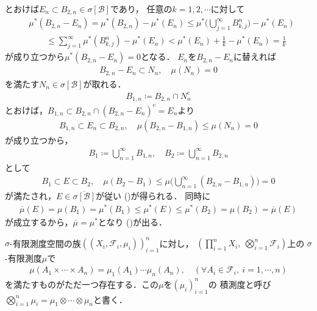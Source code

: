 \begin{prf}
\begin{description}
					とおけば$E_n \subset B_{2,n} \in \sigma[\mathcal{B}]$であり，
					任意の$k = 1,2,\cdots$に対して
					\begin{align}
						&\mu^*(B_{2,n} - E_n) = \mu^*(B_{2,n}) - \mu^*(E_n)
						\leq \mu^*\Biggl( \bigcup_{j=1}^\infty B^n_{k,j} \Biggr) - \mu^*(E_n) \\
						&\qquad \leq \sum_{j=1}^\infty \mu^*\left( B^n_{k,j} \right) - \mu^*(E_n)
						< \mu^*(E_n) + \frac{1}{k} - \mu^*(E_n)
						= \frac{1}{k}
					\end{align}
					が成り立つから$\mu^*(B_{2,n} - E_n) = 0$となる．
					$E_n$を$B_{2,n} - E_n$に替えれば
					\begin{align}
						B_{2,n} - E_n \subset N_n, \quad \mu(N_n) = 0
					\end{align}
					を満たす$N_n \in \sigma[\mathcal{B}]$が取れる．
					\begin{align}
						B_{1,n} \coloneqq B_{2,n} \cap N_n^c
					\end{align}
					とおけば，$B_{1,n} \subset B_{2,n} \cap (B_{2,n} - E_n)^c = E_n$より
					\begin{align}
						B_{1,n} \subset E_n \subset B_{2,n},
						\quad \mu(B_{2,n} - B_{1,n}) \leq \mu(N_n) = 0
					\end{align}
					が成り立つから，
					\begin{align}
						B_1 \coloneqq \bigcup_{n=1}^\infty B_{1,n},
						\quad B_2 \coloneqq \bigcup_{n=1}^\infty B_{2,n}
					\end{align}
					として
					\begin{align}
						B_1 \subset E \subset B_2,
						\quad \mu(B_2 - B_1) \leq \mu\Biggl( \bigcup_{n=1}^\infty(B_{2,n} - B_{1,n}) \Biggr) = 0
					\end{align}
					が満たされ，$E \in \overline{\sigma[\mathcal{B}]}$が従い
					()が得られる．
					同時に
					\begin{align}
						\overline{\mu}(E) = \mu(B_1) = \mu^*(B_1)
						\leq \mu^*(E) \leq \mu^*(B_2) = \mu(B_2) = \overline{\mu}(E)
					\end{align}
					が成立するから，$\overline{\mu} = \mu^*$となり
					()が出る．
					\QED
			\end{description}
		\end{prf}
		
		\begin{screen}
			\begin{thm}[積測度]
				$\sigma$-有限測度空間の族$\left((X_i,\mathscr{F}_i,\mu_i)\right)_{i=1}^n$に対し，
				$\left( \prod_{i=1}^n X_i,\ \bigotimes_{i=1}^n \mathscr{F}_i \right)$上の
				$\sigma$-有限測度$\mu$で
				\begin{align}
					\mu(A_1 \times \cdots \times A_n)
					= \mu_1(A_1) \cdots \mu_n(A_n),
					\quad (\forall A_i \in \mathscr{F}_i,\ i=1,\cdots,n)
				\end{align}
				を満たすものがただ一つ存在する．この$\mu$を$(\mu_i)_{i=1}^n$の
				積測度と呼び$\bigotimes_{i=1}^n \mu_i = \mu_1 \otimes \cdots \otimes \mu_n$と書く．
			\end{thm}
		\end{screen}
		
